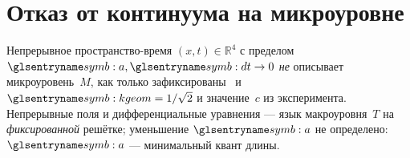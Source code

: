\section{Отказ от континуума на микроуровне}
\label{sec:no-continuum-carrier}

Непрерывное пространство-время $(x,t)\in\mathbb{R}^4$ с пределом $\caStepSpace,\htick\to 0$
\emph{не} описывает микроуровень~$M$, как только зафиксированы \latGCK\ и $\caKappaGeom=1/\sqrt{2}$
и значение~$c$ из эксперимента.
Непрерывные поля и дифференциальные уравнения --- язык макроуровня~$T$
на \emph{фиксированной} решётке; уменьшение $\caStepSpace$ не определено:
$\caStepSpace$ --- минимальный квант длины.

